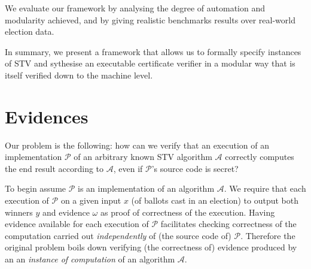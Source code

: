 \documentclass[10pt,conference]{IEEEtran}
\begin{document}

We evaluate our framework by analysing the degree of automation and modularity achieved, and by giving realistic benchmarks results over real-world election data.

In summary, we present a framework that allows us to formally specify instances of STV and sythesise an executable certificate verifier in a modular way that is itself verified down to the machine level.
\section{Evidences}
\label{sec:DataEv}
  
Our problem is the following: 
how can we verify that an execution of an implementation $\mathcal{P}$ 
of an arbitrary  known STV algorithm $\mathcal{A}$ correctly
computes the end result according to  $\mathcal{A}$, even if
$\mathcal{P}$'s source code is secret?



To begin 
assume $\mathcal{P}$ is an implementation of an algorithm
$\mathcal{A}$. We require that each execution of $\mathcal{P}$ on a
given input $x$ (of ballots cast in an election) to output both
winners $y$ and evidence $\omega$ as proof of correctness of the execution.  
 Having evidence available for each execution of $\mathcal{P}$
 facilitates checking correctness of the computation carried out
 \emph{independently} of (the source code of) $\mathcal{P}$.
 Therefore the original problem boils down verifying (the
 correctness of) evidence produced by an an
 \emph{instance of computation} of an algorithm $\mathcal{A}$.
\end{document}
